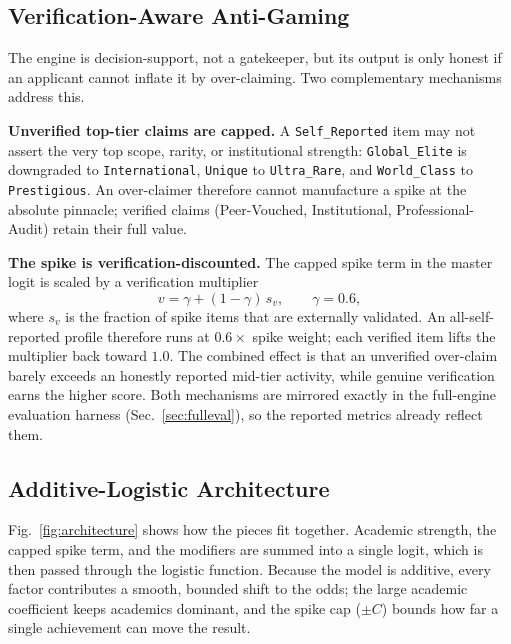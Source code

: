 \documentclass[conference]{IEEEtran}
\begin{document}
\subsection{Verification-Aware Anti-Gaming}
The engine is decision-support, not a gatekeeper, but its output is only honest if an applicant cannot inflate it by over-claiming. Two complementary mechanisms address this.

\textbf{Unverified top-tier claims are capped.} A \texttt{Self\_Reported} item may not assert the very top scope, rarity, or institutional strength: \texttt{Global\_Elite} is downgraded to \texttt{International}, \texttt{Unique} to \texttt{Ultra\_Rare}, and \texttt{World\_Class} to \texttt{Prestigious}. An over-claimer therefore cannot manufacture a spike at the absolute pinnacle; verified claims (Peer-Vouched, Institutional, Professional-Audit) retain their full value.

\textbf{The spike is verification-discounted.} The capped spike term in the master logit is scaled by a verification multiplier
\begin{equation}
v = \gamma + (1 - \gamma)\, s_v, \qquad \gamma = 0.6,
\end{equation}
where $s_v$ is the fraction of spike items that are externally validated. An all-self-reported profile therefore runs at $0.6\times$ spike weight; each verified item lifts the multiplier back toward $1.0$. The combined effect is that an unverified over-claim barely exceeds an honestly reported mid-tier activity, while genuine verification earns the higher score. Both mechanisms are mirrored exactly in the full-engine evaluation harness (Sec.~\ref{sec:fulleval}), so the reported metrics already reflect them.

\subsection{Additive-Logistic Architecture}
Fig.~\ref{fig:architecture} shows how the pieces fit together. Academic strength, the capped spike term, and the modifiers are summed into a single logit, which is then passed through the logistic function. Because the model is additive, every factor contributes a smooth, bounded shift to the odds; the large academic coefficient keeps academics dominant, and the spike cap ($\pm C$) bounds how far a single achievement can move the result.
\end{document}
